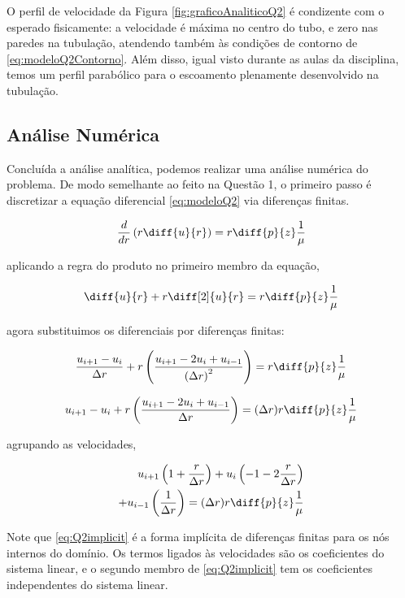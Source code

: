 O perfil de velocidade da Figura \ref*{fig:graficoAnaliticoQ2} é condizente com o
esperado fisicamente: a velocidade é máxima no centro do tubo, e zero nas paredes na tubulação,
atendendo também às condições de contorno de \eqref{eq:modeloQ2Contorno}.
Além disso, igual visto durante as aulas da disciplina, temos um perfil parabólico para o
escoamento plenamente desenvolvido na tubulação.

\subsection{Análise Numérica}

Concluída a análise analítica, podemos realizar uma análise numérica do problema. De modo semelhante
ao feito na Questão 1, o primeiro passo é discretizar a equação diferencial \eqref{eq:modeloQ2} via
diferenças finitas.

\[ \frac{d}{dr} \left(r\diff{u}{r}\right) = r \diff{p}{z} \frac{1}{\mu} \]

\noindent aplicando a regra do produto no primeiro membro da equação,

\[ \diff{u}{r} + r \diff[2]{u}{r} = r \diff{p}{z} \frac{1}{\mu} \]

\noindent agora substituimos os diferenciais por diferenças finitas:

\[ \frac{u_{i+1} - u_i}{\Delta r} + r \left(\frac{u_{i+1} - 2u_i + u_{i-1}}{\left(\Delta r\right)^2}\right) = r \diff{p}{z} \frac{1}{\mu} \]

\[ u_{i+1} - u_i + r \left(\frac{u_{i+1} - 2u_i + u_{i-1}}{\Delta r}\right) = (\Delta r) r \diff{p}{z} \frac{1}{\mu} \]

\noindent agrupando as velocidades,

\begin{equation}\label{eq:Q2implicit}
    \begin{split}
        u_{i+1} \left(1 + \frac{r}{\Delta r}\right) + u_i \left(-1 - 2\frac{r}{\Delta r}\right) \\ + u_{i-1} \left(\frac{1}{\Delta r}\right) = (\Delta r) r \diff{p}{z} \frac{1}{\mu}
    \end{split}
\end{equation}

Note que \eqref{eq:Q2implicit} é a forma implícita de diferenças finitas para os nós
internos do domínio. Os termos ligados às velocidades são os coeficientes do sistema linear,
e o segundo membro de \eqref{eq:Q2implicit} tem os coeficientes independentes do sistema linear.

